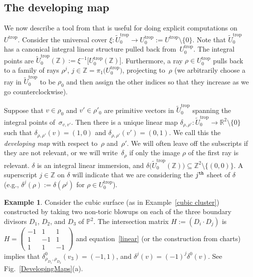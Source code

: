 \documentclass[11pt]{article}
\numberwithin{equation}{section}
\numberwithin{figure}{section}
\numberwithin{table}{section}
\DeclareMathOperator{\trop}{trop}
\let\bb=\mathbb
\let\rar=\rightarrow
\let\wt=\widetilde
\theoremstyle{definition}
\newtheorem{eg}[thm]{Example}
\begin{document}
\subsection{The developing map}\label{dev}

We now describe a tool from \cite{GHK1} that is useful for doing explicit computations on $U^{\trop}$. Consider the universal cover $\xi\colon \wt{U}_0^{\trop} \rar U^{\trop}_0:=U^{\trop}\setminus \{0\}$. Note that $\wt{U}_0^{\trop}$ has a canonical integral linear structure pulled back from~$U^{\trop}_0$. The integral points are $\wt{U}_0^{\trop}(\bb{Z}) := \xi^{-1}\big[U^{\trop}_0(\bb{Z})\big]$. Furthermore, a ray $\rho\in U^{\trop}_0$ pulls back to a family of rays $\rho^j$, $j\in \bb{Z}=\pi_1\big(U^{\trop}_0\big)$, projecting to~$\rho$ (we arbitrarily choose a ray in $\wt{U}_0^{\trop}$ to be $\rho_0$ and then assign the other indices so that they increase as we go counterclockwise).

Suppose that $v \in \rho_0$ and $v' \in \rho'_0$ are primitive vectors in $\wt{U}_0^{\trop}$ spanning the integral points of~$\sigma_{v,v'}$.
 Then there is a unique linear map $\delta_{\rho,\rho'}\colon \wt{U}_0^{\trop} \rar \bb{R}^2\setminus\{0\}$ such that $\delta_{\rho,\rho'}(v)=(1,0)$ and $\delta_{\rho,\rho'}(v')=(0,1)$. We call this the {\it developing map} with respect to~$\rho$ and~$\rho'$.
 We will often leave off the subscripts if they are not relevant, or we will write~$\delta_{\rho}$ if only
the image $\rho$ of the first ray is relevant. $\delta$ is an integral linear immersion, and $\delta\big(\wt{U}_0^{\trop}(\bb{Z})\big) \subseteq \bb{Z}^2\setminus \{(0,0)\}$. A superscript $j\in \bb{Z}$ on $\delta$ will indicate that we are considering the $j^{\tt{th}}$ sheet of $\delta$ (e.g., $\delta^j(\rho):=\delta(\rho^j)$ for $\rho\in U^{\trop}_0$).

\begin{eg} \label{cubicdevelop}
Consider the cubic surface (as in Example~\ref{cubic cluster}) constructed by taking two non-toric blowups on each of the three boundary divisors $D_1$, $D_2$, and $D_3$ of $\bb{P}^2$. The intersection matrix $H:=(D_i \cdot D_j)$ is $
H=	\left(\begin{smallmatrix}
		-1 &1 & 1 \\
		1 &-1 & 1 \\
		1 &1 & -1
		\end{smallmatrix}\right)
$
and equation~\eqref{linear} (or the construction from charts) implies that $\delta^0_{\rho_{D_1},\rho_{D_2}}(v_3) = (-1,1)$, and $\delta^j(v) = (-1)^j\delta^0(v)$. See Fig.~\ref{DevelopingMaps}(a).
\end{eg}
\end{document}
